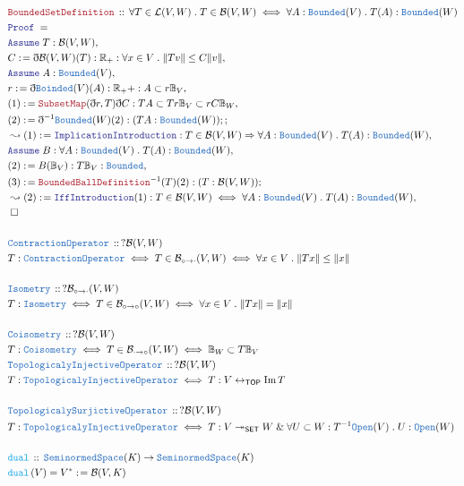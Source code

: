 \documentclass[12pt]{scrartcl}
\newcommand{\TYPE}[1]{\textcolor{NavyBlue}{\mathtt{#1}}}
\newcommand{\FUNC}[1]{\textcolor{Cerulean}{\mathtt{#1}}}
\newcommand{\LOGIC}[1]{\textcolor{Blue}{\mathtt{#1}}}
\newcommand{\THM}[1]{\textcolor{Maroon}{\mathtt{#1}}}
\renewcommand{\.}{\; . \;}
\newcommand{\de}{: \kern 0.1pc =}
\newcommand{\Act}[1]{\left( #1 \right)}
\newcommand{\Theorem}[2]{& \THM{#1} \, :: \, #2 \\ & \Proof = \\ }
\newcommand{\DeclareType}[2]{& \TYPE{#1} \, :: \, #2 \\}
\newcommand{\DefineType}[3]{& #1 : \TYPE{#2} \iff #3 \\}
\newcommand{\DefineNamedType}[4]{& #1 : \TYPE{#2} \iff #3 \iff #4 \\}
\newcommand{\DeclareFunc}[2]{& \FUNC{#1} \, :: \, #2 \\}
\newcommand{\DefineNamedFunc}[4]{&  \FUNC{#1}\Act{#2} = #3 \de #4 \\}
\newcommand{\Page}[1]{\begin{align*} #1 \end{align*} \newpage   }
\newcommand{ \bd }{ \ByDef }
\renewcommand{\And}{\; \& \;}
\newcommand{\Reals}{\mathbb{R} }
\DeclareMathOperator*{\im}{Im}
\newcommand{\ToSurj}{\twoheadrightarrow}
\newcommand{\ToBij}{\leftrightarrow}
\newcommand{\Say}[3]{& #1 \de #2 : #3, \\}
\newcommand{\Conclude}[3]{& #1 \de #2 : #3; \\}
\newcommand{\Derive}[3]{& \leadsto #1 \de #2 : #3, \\}
\newcommand{\A}{\LOGIC{Assume} \;}
\newcommand{\Assume}[2]{& \A #1 : #2, \\}
\newcommand{\QED}{\; \square}
\newcommand{\EndProof}{& \QED \\}
\newcommand{\ByDef}{\eth}
\newcommand{\Proof}{\LOGIC{Proof} \; }
\newcommand{\TOP}{\mathsf{TOP}}
\newcommand{\SNS}{\TYPE{SeminormedSpace}} %
\newcommand{\B}{\mathcal{B}}
\begin{document}
\Page{
 \Theorem{BoundedSetDefinition}{ 
 \forall T \in \mathcal{L}(V,W) \.  T \in \B(V,W) \iff \forall A : \TYPE{Bounded}(V) \. T(A) : \TYPE{Bounded}(W)
  }
 \Assume{T}{\B(V,W)}
 \Say{C}{\bd \B(V,W)(T)}{ \Reals_+ : \forall x \in V \. \| Tv \| \le C \| v \|}
 \Assume{A}{\TYPE{Bounded}(V)}
 \Say{r}{\bd \TYPE{Boinded}(V)(A)}{\Reals_++ : A \subset r\mathbb{B}_V}
 \Say{(1)}{\THM{SubsetMap}(\bd r, T)\bd C}{ TA \subset Tr\mathbb{B}_V \subset rC \mathbb{B}_W }
 \Conclude{(2)}{\bd^{-1} \TYPE{Bounded}(W)(2)}{ ( TA : \TYPE{Bounded}(W));}
 \Derive{(1)}{ \LOGIC{ImplicationIntroduction}}{ T \in \B(V,W) 
 \Rightarrow \forall A : \TYPE{Bounded}(V) \. T(A) : \TYPE{Bounded}(W)}
 \Assume{ B}{ \forall A : \TYPE{Bounded}(V) \. T(A) : \TYPE{Bounded}(W)}
 \Say{ (2) }{  B( \mathbb{B}_V) }{ T \mathbb{B}_V : \TYPE{Bounded} }
 \Conclude{ (3) }{ \THM{BoundedBallDefinition}^{-1}(T)(2) }{ (T : \B(V,W)) }
 \Derive{(2)}{\LOGIC{IffIntroduction}(1)}
 { T \in \B(V,W) \iff \forall A : \TYPE{Bounded}(V) \. T(A) : \TYPE{Bounded}(W) }    
 \EndProof
 \\
 \DeclareType{ContractionOperator}{? \B(V,W)}
 \DefineNamedType{T}{ContractionOperator}{ T \in \B_{\circ \to \cdot}(V,W)}
 {\forall x \in V \. \|Tx \| \le \| x \| }
 \\
 \DeclareType{Isometry}{? \B_{\circ \to \cdot}(V,W)}
 \DefineNamedType{T}{Isometry}{ T \in \B_{\circ \to \circ}(V,W) }{ \forall x \in V \. \|Tx \| = \| x \|}
 \\ 
 \DeclareType{Coisometry}{? \B(V,W)}
 \DefineNamedType{T}{Coisometry}{T \in \B_{\cdot \to \circ}(V,W)}{ \mathbb{B}_W \subset T\mathbb{B}_V
 \\
 \DeclareType{TopologicalyInjectiveOperator}{? \B(V,W)}
 \DefineType{T}{TopologicalyInjectiveOperator}{ T : V \ToBij_{\TOP} \im T}
 \\
 \DeclareType{TopologicalySurjictiveOperator}{ ? \B(V,W) }
  \DefineType{T}{TopologicalyInjectiveOperator}{ T : V \ToSurj_{\mathsf{SET}} W \And \forall
   U \subset W : T^{-1}\TYPE{Open}(V) \. U : \TYPE{Open}(W) }  
 \\
 \DeclareFunc{dual}{ \SNS(K) \to \SNS(K) }
 \DefineNamedFunc{dual}{V}{V^*}{\B(V,K)} 
  }
} 
\end{document}
